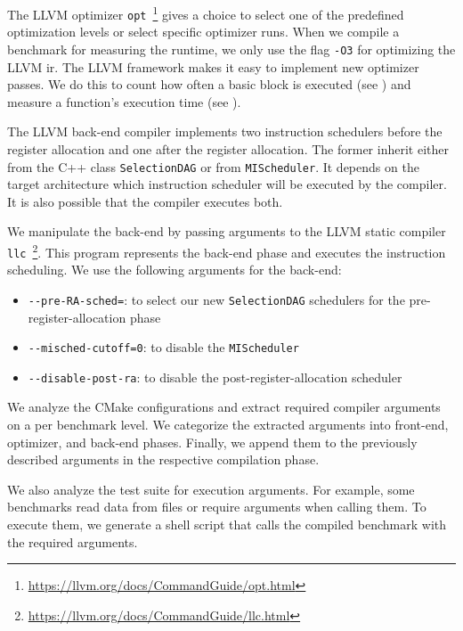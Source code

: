 The LLVM optimizer \lstinline{opt}~\footnote{\url{https://llvm.org/docs/CommandGuide/opt.html}} gives a choice to select one of the predefined optimization levels or select specific optimizer runs.
When we compile a benchmark for measuring the runtime, we only use the flag \lstinline{-O3} for optimizing the LLVM \ac{ir}.
The LLVM framework makes it easy to implement new optimizer passes.
We do this to count how often a basic block is executed (see ) and measure a function's execution time (see ).

The LLVM back-end compiler implements two instruction schedulers before the register allocation and one after the register allocation.
The former inherit either from the C++ class \lstinline{SelectionDAG} or from \lstinline{MIScheduler}.
It depends on the target architecture which instruction scheduler will be executed by the compiler. 
It is also possible that the compiler executes both.

We manipulate the back-end by passing arguments to the LLVM static compiler \lstinline{llc}~\footnote{\url{https://llvm.org/docs/CommandGuide/llc.html}}.
This program represents the back-end phase and executes the instruction scheduling.
We use the following arguments for the back-end:
\begin{itemize}
    \item \lstinline{--pre-RA-sched=}: to select our new \lstinline{SelectionDAG} schedulers for the pre-register-allocation phase
    \item \lstinline{--misched-cutoff=0}: to disable the \lstinline{MIScheduler}
    \item \lstinline{--disable-post-ra}: to disable the post-register-allocation scheduler
\end{itemize}

We analyze the CMake configurations and extract required compiler arguments on a per benchmark level.
We categorize the extracted arguments into front-end, optimizer, and back-end phases.
Finally, we append them to the previously described arguments in the respective compilation phase.

We also analyze the test suite for execution arguments.
For example, some benchmarks read data from files or require arguments when calling them.
To execute them, we generate a shell script that calls the compiled benchmark with the required arguments.

